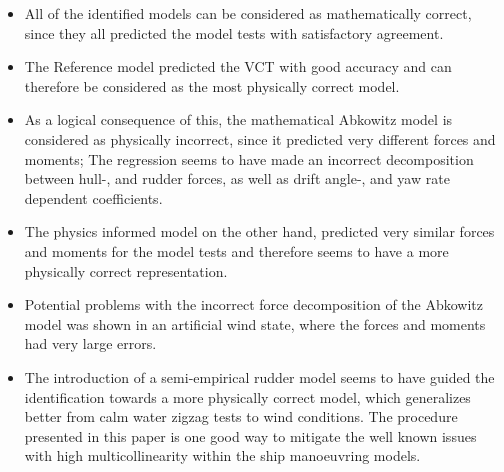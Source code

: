\begin{itemize}
    \item All of the identified models can be considered as mathematically correct, since they all predicted the model tests with satisfactory agreement.
    
    \item The Reference model predicted the VCT with good accuracy and can therefore be considered as the most physically correct model.   
    \item As a logical consequence of this, the mathematical Abkowitz model is considered as physically incorrect, since it predicted very different forces and moments; The regression seems to have made an incorrect decomposition between hull-, and rudder forces, as well as drift angle-, and yaw rate dependent coefficients.  
    \item The physics informed model on the other hand, predicted very similar forces and moments for the model tests and therefore seems to have a more physically correct representation.
    \item Potential problems with the incorrect force decomposition of the Abkowitz model was shown in an artificial wind state, where the forces and moments had very large errors. 
    \item The introduction of a semi-empirical rudder model seems to have guided the identification towards a more physically correct model, which generalizes better from calm water zigzag tests to wind conditions. The procedure presented in this paper is one good way to mitigate the well known issues with high multicollinearity within the ship manoeuvring models.
\end{itemize}